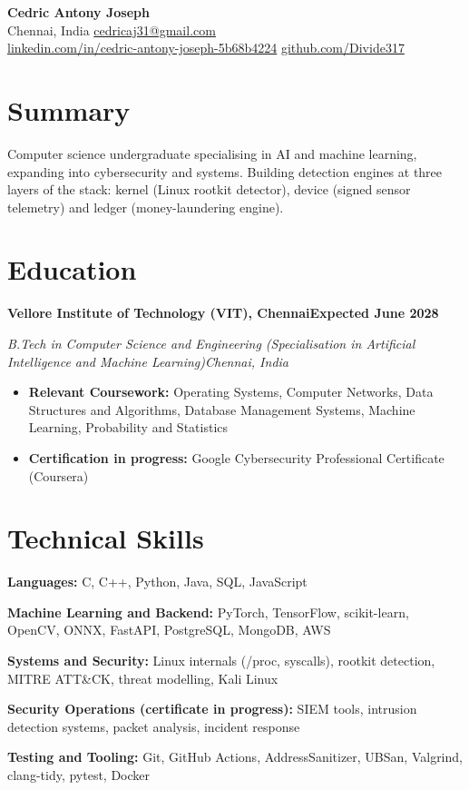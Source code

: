 \documentclass[10pt,a4paper]{article}
\newcommand{\entry}[2]{\textbf{#1}\hfill\textbf{#2}\par}
\newcommand{\role}[2]{\textit{#1}\hfill\textit{#2}\par}
\providecommand{\phoneline}{}
\begin{document}
\begin{center}
  {\LARGE\bfseries Cedric Antony Joseph}\\[5pt]
  Chennai, India \textbar{} \phoneline
  \href{mailto:cedricaj31@gmail.com}{cedricaj31@gmail.com}\\[2pt]
  \href{https://www.linkedin.com/in/cedric-antony-joseph-5b68b4224/}{linkedin.com/in/cedric-antony-joseph-5b68b4224} \textbar{}
  \href{https://github.com/Divide317}{github.com/Divide317}
\end{center}
\vspace{-6pt}

\section{Summary}
Computer science undergraduate specialising in AI and machine learning, expanding into cybersecurity and systems. Building detection engines at three layers of the stack: kernel (Linux rootkit detector), device (signed sensor telemetry) and ledger (money-laundering engine).

\section{Education}
\entry{Vellore Institute of Technology (VIT), Chennai}{Expected June 2028}
\role{B.Tech in Computer Science and Engineering (Specialisation in Artificial Intelligence and Machine Learning)}{Chennai, India}
\begin{itemize}
  \item \textbf{Relevant Coursework:} Operating Systems, Computer Networks, Data Structures and Algorithms, Database Management Systems, Machine Learning, Probability and Statistics
  \item \textbf{Certification in progress:} Google Cybersecurity Professional Certificate (Coursera)
\end{itemize}

\section{Technical Skills}
\textbf{Languages:} C, C++, Python, Java, SQL, JavaScript\par
\vspace{1.5pt}
\textbf{Machine Learning and Backend:} PyTorch, TensorFlow, scikit-learn, OpenCV, ONNX, FastAPI, PostgreSQL, MongoDB, AWS\par
\vspace{1.5pt}
\textbf{Systems and Security:} Linux internals (/proc, syscalls), rootkit detection, MITRE ATT\&CK, threat modelling, Kali Linux\par
\vspace{1.5pt}
\textbf{Security Operations (certificate in progress):} SIEM tools, intrusion detection systems, packet analysis, incident response\par
\vspace{1.5pt}
\textbf{Testing and Tooling:} Git, GitHub Actions, AddressSanitizer, UBSan, Valgrind, clang-tidy, pytest, Docker\par
\end{document}
